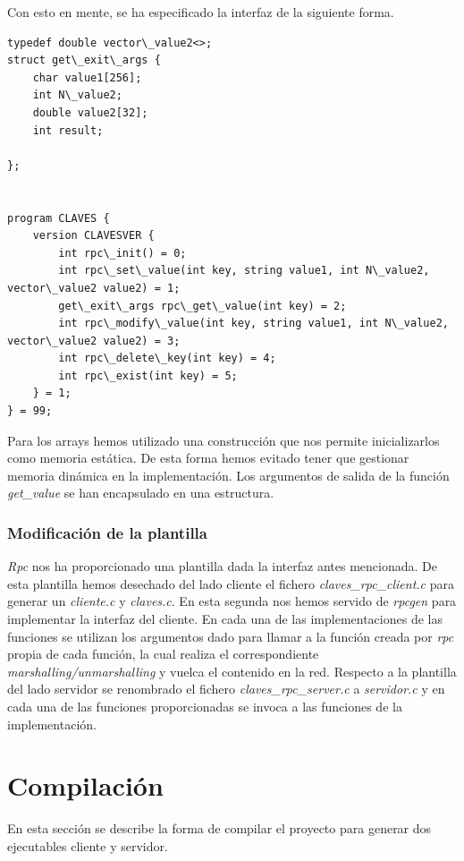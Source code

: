 \documentclass[]{article}
\begin{document}
Con esto en mente, se ha especificado la interfaz de la siguiente forma. 
\begin{center}
\begin{lstlisting}[caption=Compiación de biblioteca dinámica]
typedef double vector\_value2<>;
struct get\_exit\_args {
    char value1[256];
    int N\_value2;
    double value2[32];
    int result;

};


program CLAVES {
    version CLAVESVER {
        int rpc\_init() = 0;
        int rpc\_set\_value(int key, string value1, int N\_value2, vector\_value2 value2) = 1;
        get\_exit\_args rpc\_get\_value(int key) = 2;
        int rpc\_modify\_value(int key, string value1, int N\_value2, vector\_value2 value2) = 3;
        int rpc\_delete\_key(int key) = 4; 
        int rpc\_exist(int key) = 5; 
    } = 1;
} = 99; 

\end{lstlisting}
\end{center}

Para los arrays hemos utilizado una construcción que nos permite inicializarlos como memoria estática. De esta forma hemos evitado tener que gestionar memoria dinámica en la implementación. Los argumentos de salida de la función \textit{get\_value} se han encapsulado en una estructura.  

\subsubsection{Modificación de la plantilla}
\label{subsec::modificacion_plantilla}

\textit{Rpc} nos ha proporcionado una plantilla dada la interfaz antes mencionada. De esta plantilla hemos desechado del lado cliente el fichero \textit{claves\_rpc\_client.c} para generar un \textit{cliente.c} y \textit{claves.c}. En esta segunda nos hemos servido de \textit{rpcgen} para implementar la interfaz del cliente. En cada una de las implementaciones de las funciones se utilizan los argumentos dado para llamar a la función creada por \textit{rpc} propia de cada función, la cual realiza el correspondiente \textit{marshalling/unmarshalling} y vuelca el contenido en la red.
Respecto a la plantilla del lado servidor se renombrado el fichero \textit{claves\_rpc\_server.c} a \textit{servidor.c} y en cada una de las funciones proporcionadas se invoca a las funciones de la implementación.

\section{Compilación}
\label{sec:compilacion}
En esta sección se describe la forma de compilar el proyecto para generar dos ejecutables cliente y servidor.
\end{document}
